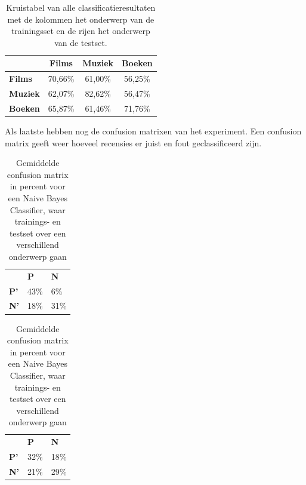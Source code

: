 \begin{table}[h]
\centering
\begin{tabular}{l|c|c|c|}
\cline{2-4}
                                      & \textbf{Films} & \textbf{Muziek} & \textbf{Boeken} \\ \hline
\multicolumn{1}{|l|}{\textbf{Films}} & 70,66\%         & 61,00\%         & 56,25\%         \\ \hline
\multicolumn{1}{|l|}{\textbf{Muziek}} & 62,07\%         & 82,62\%         & 56,47\%         \\ \hline
\multicolumn{1}{|l|}{\textbf{Boeken}} & 65,87\%         & 61,46\%         & 71,76\%         \\ \hline
\end{tabular}
\label{tab:alles}
\caption{Kruistabel van alle classificatieresultaten met de kolommen het onderwerp van de trainingsset en de rijen het onderwerp van de testset.} 
\end{table}

Als laatste hebben nog de confusion matrixen van het experiment. Een confusion matrix geeft weer hoeveel recensies er juist en fout geclassificeerd zijn. 

\begin{table}[h]
\centering
\setlength\tabcolsep{4pt}
\begin{minipage}[t]{0.48\textwidth}
\centering
\begin{tabular}{lll}
                                 & \textbf{P}               & \textbf{N}               \\ \cline{2-3} 
\multicolumn{1}{l|}{\textbf{P'}} & \multicolumn{1}{l|}{43\%} & \multicolumn{1}{l|}{6\%} \\ \cline{2-3} 
\multicolumn{1}{l|}{\textbf{N'}} & \multicolumn{1}{l|}{18\%} & \multicolumn{1}{l|}{31\%} \\ \cline{2-3} 
\end{tabular}
\caption{Gemiddelde confusion matrix in percent voor een Naive Bayes Classifier, waar trainings- en testset over hetzelfde onderwerp gaan}
\end{minipage}%
\hfill
\begin{minipage}[t]{0.48\textwidth}
\centering
\begin{tabular}{lll}
                                 & \textbf{P}               & \textbf{N}               \\ \cline{2-3} 
\multicolumn{1}{l|}{\textbf{P'}} & \multicolumn{1}{l|}{32\%} & \multicolumn{1}{l|}{18\%} \\ \cline{2-3} 
\multicolumn{1}{l|}{\textbf{N'}} & \multicolumn{1}{l|}{21\%} & \multicolumn{1}{l|}{29\%} \\ \cline{2-3} 
\end{tabular}
\caption{Gemiddelde confusion matrix in percent voor een Naive Bayes Classifier, waar trainings- en testset over een verschillend onderwerp gaan} 
\end{minipage}
\end{table}

